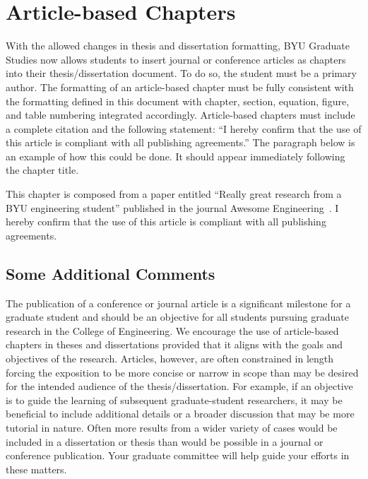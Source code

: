 \chapter{Article-based Chapters}
\label{ch:article_based_chap}

With the allowed changes in thesis and dissertation formatting, BYU Graduate Studies
now allows students to insert journal or conference articles as chapters into their
thesis/dissertation document. To do so, the student must be a primary author. The
formatting of an article-based chapter must be fully consistent with the formatting
defined in this document with chapter, section, equation, figure, and table numbering
integrated accordingly. Article-based chapters must include a complete citation and
the following statement: ``I hereby confirm that the use of this article is compliant
with all publishing agreements.'' The paragraph below is an example of how this could
be done. It should appear immediately following the chapter title.

\noindent This chapter is composed from a paper entitled ``Really great research from
a BYU engineering student'' published in the journal Awesome Engineering~\cite{StudentRP20}.
I hereby confirm that the use of this article is compliant with all publishing agreements.

\section{Some Additional Comments}
The publication of a conference or journal article is a significant milestone for a graduate 
student and should be an objective for all students pursuing graduate research in the College 
of Engineering. We encourage the use of article-based chapters in theses and dissertations 
provided that it aligns with the goals and objectives of the research. Articles, however, 
are often constrained in length forcing the exposition to be more concise or narrow in 
scope than may be desired for the intended audience of the thesis/dissertation. For example, 
if an objective is to guide the learning of subsequent graduate-student researchers, it 
may be beneficial to include additional details or a broader discussion that may be more 
tutorial in nature. Often more results from a wider variety of cases would be included 
in a dissertation or thesis than would be possible in a journal or conference publication. 
Your graduate committee will help guide your efforts in these matters.
